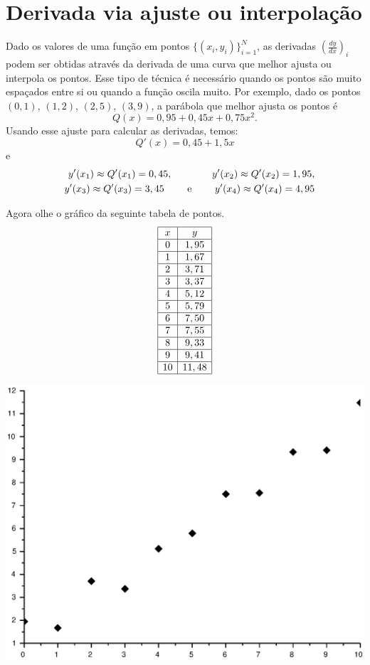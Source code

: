\section{Derivada via ajuste ou interpolação}

Dado os valores de uma função em pontos $\{(x_i,y_i)\}_{i=1}^N$, as derivadas $\left(\frac{dy}{dx}\right)_i$ podem ser obtidas através da derivada de uma curva que melhor ajusta ou interpola os pontos. Esse tipo de técnica é necessário quando os pontos são muito espaçados entre si ou quando a função oscila muito. Por exemplo, dado os pontos $(0,1)$, $(1,2)$, $(2,5)$, $(3,9)$, a parábola que melhor ajusta os pontos é
$$
Q(x)=0,95 + 0,45x + 0,75x^2.
$$
Usando esse ajuste para calcular as derivadas, temos:
$$
Q'(x)=0,45 + 1,5x
$$
e
\begin{eqnarray*}
&&y'(x_1)\approx Q'(x_1)=0,45, \qquad\qquad y'(x_2)\approx Q'(x_2)=1,95, \\&& y'(x_3)\approx Q'(x_3)=3,45 \qquad ~ \hbox{e} ~ \qquad y'(x_4)\approx Q'(x_4)=4,95
\end{eqnarray*}

Agora olhe o gráfico da seguinte tabela de pontos.
$$
\begin{array}{|c|c|}
\hline
x&y\\
\hline
0    & 1,95  \\
\hline
    1&     1,67  \\
		\hline
    2 &    3,71  \\
		\hline
    3  &   3,37  \\
		\hline
    4   &  5,12   \\
		\hline
    5&     5,79  \\
		\hline
    6 &    7,50  \\
		\hline
    7  &   7,55  \\
		\hline
    8   &  9,33  \\
		\hline
    9   &  9,41   \\
		\hline
    10  &  11,48  \\
		\hline
\end{array}
$$
\begin{center}
\includegraphics[scale=0.5]{./cap_derivacao/pics/graf_der.eps}
\end{center}

